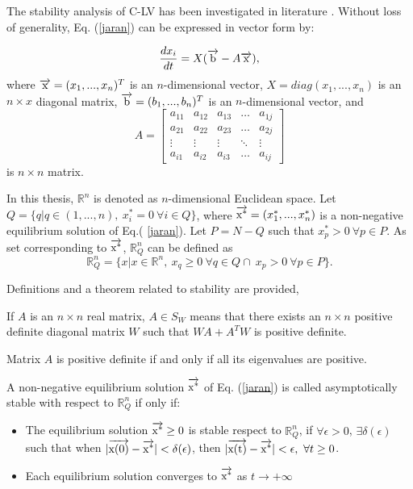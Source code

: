 The stability analysis of C-LV has been investigated in literature \cite{LADDE199299}. Without loss of generality,  Eq. (\ref{jaran}) can be expressed in vector form by:

\begin{equation}
\label{barulagiini}
\frac{dx_i}{dt}=X ( \overrightarrow{\rm b} -A \overrightarrow{\rm x} ),
\end{equation}
where $ \overrightarrow{\rm x} = (x_1, ..., x_n)^T $ is an $n$-dimensional vector, $X = diag(x_1, ..., x_n)$ is an $n \times x$ diagonal matrix, $ \overrightarrow{\rm b} = (b_1, ..., b_n)^T$ is an $n$-dimensional vector, and 
$$ A = \begin{bmatrix}
a_{11} & a_{12} & a_{13} & \dots  & a_{1j} \\
a_{21} & a_{22} & a_{23} & \dots  & a_{2j} \\
\vdots & \vdots & \vdots & \ddots & \vdots \\
a_{i1} & a_{i2} & a_{i3} & \dots  & a_{ij}
\end{bmatrix} $$
is $n \times n$ matrix.

In this thesis, $\mathbb{R}^n$ is denoted as $n$-dimensional Euclidean space. Let $Q = \{q | q \in (1, ..., n),~ x^*_i=0~\forall i \in Q\}$, where $\overrightarrow{\rm x^*} = (x_1^*, ..., x_n^*)$ is a non-negative equilibrium solution of Eq.( \ref{jaran}). Let $ P = N - Q $ such that $ x^*_p>0~\forall p \in P$. As set corresponding to $\overrightarrow{\rm x^*}$, $\mathbb{R}^n_Q$ can be defined as $$\mathbb{R}^n_Q = \{x|x \in \mathbb{R}^n,~x_q \geq 0~\forall q \in Q  \cap~x_p > 0~\forall p \in P  \}.$$

Definitions and a theorem related to stability are provided,

\begin{definition}
	If $A$ is an $n \times n$ real matrix, $A \in S_W$ means that there exists an $n \times n$ positive definite diagonal matrix $W$ such that $WA + A^TW$ is positive definite.
\end{definition}

\begin{theorem}
	Matrix $A$ is positive definite if and only if all its eigenvalues are positive.
\end{theorem}

\begin{definition}
	A non-negative equilibrium solution $\overrightarrow{\rm x^*}$ of Eq. (\ref{jaran}) is called asymptotically stable with respect to $\mathbb{R}^n_Q$ if only if:
	\begin{itemize}
		\item The equilibrium solution $\overrightarrow{\rm x^*} \geq 0$ is stable respect to $\mathbb{R}^n_Q$, if $ \forall \epsilon > 0$, $ \exists \delta(\epsilon)$ such that when $|\overrightarrow{\rm x(0)} - \overrightarrow{\rm x^*}| < \delta (\epsilon)$, then $|\overrightarrow{\rm x(t)} - \overrightarrow{\rm x^*}| < \epsilon,~\forall t \geq 0$.
		\item Each equilibrium solution converges to $\overrightarrow{\rm x^*}$ as $t \rightarrow + \infty $
	\end{itemize}
\end{definition}

